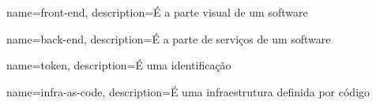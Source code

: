 \makeglossaries

 {
    name=front-end,
    description={É a parte visual de um software}
}

 {
    name=back-end,
    description={É a parte de serviços de um software}
}

 {
    name=token,
    description={É uma identificação}
}

 {
    name=infra-as-code,
    description={É uma infraestrutura definida por código}
}


